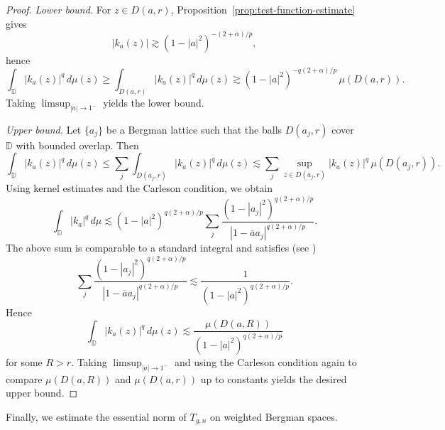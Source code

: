 \documentclass[preprint,12pt]{elsarticle}
\numberwithin{equation}{section}
\theoremstyle{remark}
\begin{document}
\begin{proof}
\textit{Lower bound.}
For $z\in D(a,r)$, Proposition~\ref{prop:test-function-estimate} gives
\begin{equation*}
|k_a(z)|\gtrsim (1-|a|^2)^{-(2+\alpha)/p},
\end{equation*}
hence
\begin{equation*}
\int_{\mathbb D}|k_a(z)|^q\,d\mu(z)
\ge \int_{D(a,r)}|k_a(z)|^q\,d\mu(z)
\gtrsim (1-|a|^2)^{-q(2+\alpha)/p}\,\mu(D(a,r)).
\end{equation*}
Taking $\limsup_{|a|\to 1^-}$ yields the lower bound.

\medskip
\noindent\textit{Upper bound.}
Let $\{a_j\}$ be a Bergman lattice such that the balls $D(a_j,r)$ cover $\mathbb D$ with bounded overlap.
Then
\begin{equation*}
\int_{\mathbb D}|k_a(z)|^q\,d\mu(z)
\le \sum_j \int_{D(a_j,r)} |k_a(z)|^q\,d\mu(z)
\lesssim \sum_j \sup_{z\in D(a_j,r)} |k_a(z)|^q \,\mu(D(a_j,r)).
\end{equation*}
Using kernel estimates and the Carleson condition,
we obtain
\begin{equation*}
\int_{\mathbb D}|k_a|^q\,d\mu
\lesssim
(1-|a|^2)^{q(2+\alpha)/p}
\sum_j
\frac{(1-|a_j|^2)^{q(2+\alpha)/p}}{|1-\overline a a_j|^{q(2+\alpha)/p}}.
\end{equation*}
The above sum is comparable to a standard integral and satisfies (see \cite[Ch.~2]{Zhu2005})
\begin{equation*}
\sum_j
\frac{(1-|a_j|^2)^{q(2+\alpha)/p}}{|1-\overline a a_j|^{q(2+\alpha)/p}}
\lesssim
\frac{1}{(1-|a|^2)^{q(2+\alpha)/p}}.
\end{equation*}
Hence
\begin{equation*}
\int_{\mathbb D}|k_a(z)|^q\,d\mu(z)
\lesssim
\frac{\mu(D(a,R))}{(1-|a|^2)^{q(2+\alpha)/p}}
\end{equation*}
for some $R>r$. Taking $\limsup_{|a|\to1^-}$ and using the Carleson condition again to compare
$\mu(D(a,R))$ and $\mu(D(a,r))$ up to constants yields the desired upper bound.
\end{proof}

Finally, we estimate the essential norm of $T_{g,n}$ on weighted Bergman spaces.
\end{document}
